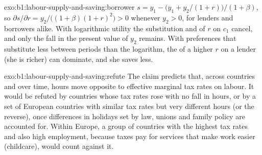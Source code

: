 \begin{solution}{exo:b1:labour-supply-and-saving:borrower}
$s = y_1 - \bigl(y_1 + y_2/(1 + r)\bigr)/(1 + \beta)$, so
$\partial s/\partial r = y_2/\bigl((1 + \beta)(1 + r)^2\bigr) > 0$ whenever $y_2 > 0$, for
lenders and borrowers alike. With logarithmic utility the substitution and
 of $r$ on $c_1$ cancel, and only the fall in the present value of
$y_2$ remains. With preferences that substitute less between periods than
the logarithm, the  of a higher $r$ on a lender (she is richer)
can dominate, and she saves less.
\end{solution}

\begin{solution}{exo:b1:labour-supply-and-saving:refute}
The claim predicts that, across countries and over time, hours move
opposite to effective marginal tax rates on labour. It would be refuted by
countries whose tax rates rose with no fall in hours, or by a set of
European countries with similar tax rates but very different hours (or
the reverse), once differences in holidays set by law, unions and family
policy are accounted for. Within Europe, a group of countries with the
highest tax rates and also high employment, because taxes pay for services
that make work easier (childcare), would count against it.
\end{solution}

